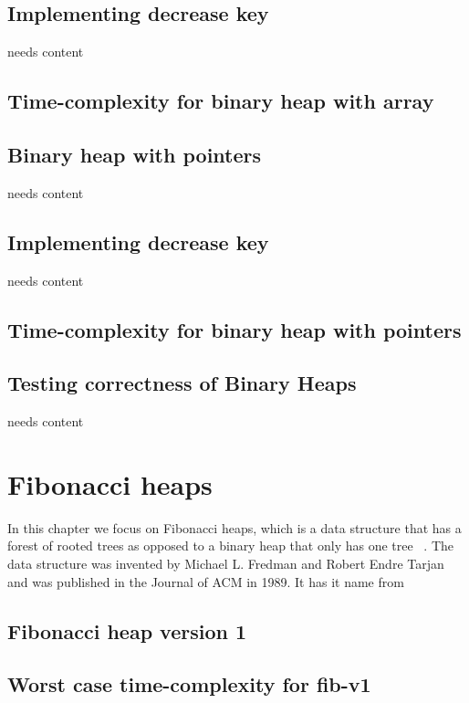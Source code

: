 \documentclass[12pt,a4paper,twoside,danish,article]{memoir}
\begin{document}
\section{Implementing decrease key}

needs content

\section{Time-complexity for binary heap with array}

\section{Binary heap with pointers}

needs content

\section{Implementing decrease key}

needs content

\section{Time-complexity for binary heap with pointers}

\section{Testing correctness of Binary Heaps}

needs content

\chapter{Fibonacci heaps}

In this chapter we focus on Fibonacci heaps, which is a data structure that has a forest of rooted trees as opposed to a binary heap that only has one tree ~\cite{FT87}. The data structure was invented by Michael L. Fredman and Robert Endre Tarjan and was published in the Journal of ACM in 1989. It has it name from 
\section{Fibonacci heap version 1}


\section{Worst case time-complexity for fib-v1}
\end{document}
